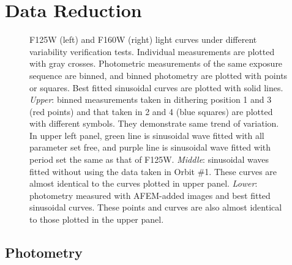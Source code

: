 \documentclass[apj]{emulateapj}
\newcommand{\ima}{\texttt{ima} files }
\newcommand{\flt}{\texttt{flt} files }
\begin{document}
\section{Data Reduction}



 \begin{figure}
  \centering
  \caption{F125W (left) and F160W (right) light curves under different
    variability verification tests. Individual measurements are
    plotted with gray crosses. Photometric measurements of the same exposure
    sequence are binned, and binned photometry are plotted with points
    or squares. Best fitted sinusoidal curves are plotted with solid
    lines. {\em Upper}: binned measurements taken in dithering
    position 1 and 3 (red points) and that taken in 2 and 4 (blue
    squares) are plotted with different symbols. They demonstrate same
    trend of variation. In upper left panel, green line is sinusoidal
    wave fitted with all parameter set free, and purple line is
    sinusoidal wave fitted with period set the same as that of
    F125W. {\em Middle}: sinusoidal waves fitted without using the
    data taken in Orbit \#1. These curves are almost identical to the
    curves plotted in upper panel. {\em Lower}: photometry measured
    with AFEM-added images and best fitted sinusoidal curves. These
    points and curves are also almost identical to those plotted
    in the upper panel.}
  \label{fig:2}
\end{figure}


\subsection{Photometry}
\end{document}
